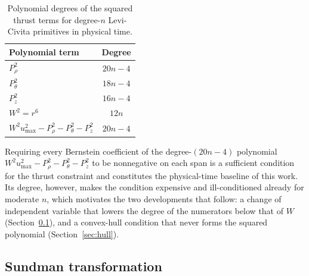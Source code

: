 \begin{table}[htbp]
	\centering
	\caption{Polynomial degrees of the squared thrust terms for degree-$n$
		Levi-Civita primitives in physical time.}
	\label{tab:thrust-certificate-degrees}
	\begin{tabular}{lc}
		\toprule
		\textbf{Polynomial term} & \textbf{Degree} \\
		\midrule
		$P_\rho^{2}$   & $20n-4$ \\
		$P_\theta^{2}$ & $18n-4$ \\
		$P_z^{2}$      & $16n-4$ \\
		$W^2=r^6$      & $12n$   \\
		\midrule
		$W^2u_{\max}^2-P_\rho^{2}-P_\theta^{2}-P_z^{2}$
		& $20n-4$ \\
		\bottomrule
	\end{tabular}
\end{table}

Requiring every Bernstein coefficient of the degree-$(20n-4)$ polynomial
$W^2u_{\max}^2-P_\rho^{2}-P_\theta^{2}-P_z^{2}$ to be nonnegative on each span
is a sufficient condition for the thrust constraint and constitutes the
physical-time baseline of this work. Its degree, however, makes the condition
expensive and ill-conditioned already for moderate $n$, which motivates the
two developments that follow: a change of independent variable that lowers
the degree of the numerators below that of $W$
(Section~\ref{sec:sundman}), and a convex-hull condition that never forms the
squared polynomial (Section~\ref{sec:hull}).

\subsection{Sundman transformation}
\label{sec:sundman}

